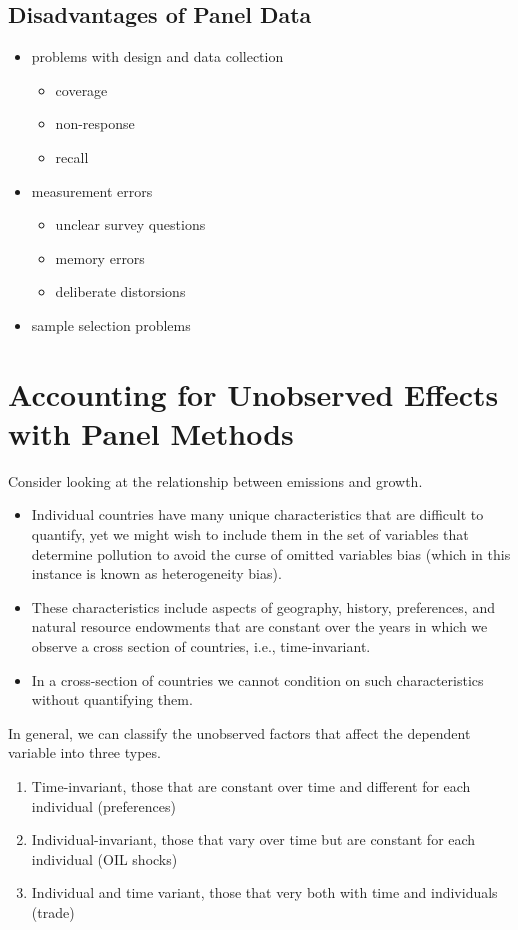\documentclass[landscape,letterpaper,9pt]{article}
\begin{document}
\subsection{Disadvantages of Panel Data}
\begin{itemize}
\item problems with design and  data collection

\begin{itemize}
\item coverage
\item non-response
\item recall
\end{itemize}
\item measurement errors
\begin{itemize}
\item unclear survey questions
\item memory errors
\item deliberate distorsions
\end{itemize}

\item sample selection problems
\end{itemize}


\section{Accounting for Unobserved Effects with Panel Methods}

Consider looking at the relationship between emissions and growth.
\begin{itemize}
\item Individual countries have many unique characteristics
that are difficult to quantify, yet we might wish to include them in the set of variables
that determine pollution to avoid the curse of omitted variables bias (which in this instance is known
as heterogeneity bias).

\item These characteristics
include aspects of geography, history, preferences, and natural resource endowments that are
constant over the years in which we observe a cross section of countries, i.e., time-invariant.

\item In a cross-section of countries we cannot condition on such characteristics without quantifying them.
\end{itemize}

In general, we can classify the unobserved factors that affect the dependent variable into three types.
\begin{enumerate}
    \item Time-invariant, those that are constant over time and different for each individual (preferences)
    \item Individual-invariant,  those that vary over time but are constant for each individual (OIL shocks)
    \item Individual and time variant,  those that very both with time and individuals (trade)
\end{enumerate}
\end{document}
